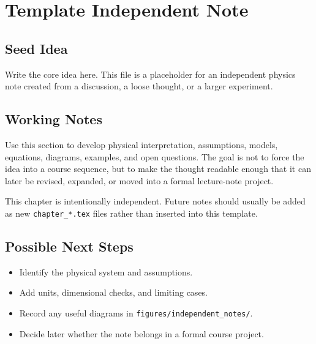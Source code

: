 \chapter{Template Independent Note}

\section{Seed Idea}

Write the core idea here. This file is a placeholder for an independent physics
note created from a discussion, a loose thought, or a larger experiment.

\section{Working Notes}

Use this section to develop physical interpretation, assumptions, models,
equations, diagrams, examples, and open questions. The goal is not to force the
idea into a course sequence, but to make the thought readable enough that it can
later be revised, expanded, or moved into a formal lecture-note project.

\begin{remarkbox}
This chapter is intentionally independent. Future notes should usually be added
as new \texttt{chapter\_*.tex} files rather than inserted into this template.
\end{remarkbox}

\section{Possible Next Steps}

\begin{itemize}
    \item Identify the physical system and assumptions.
    \item Add units, dimensional checks, and limiting cases.
    \item Record any useful diagrams in \texttt{figures/independent\_notes/}.
    \item Decide later whether the note belongs in a formal course project.
\end{itemize}
